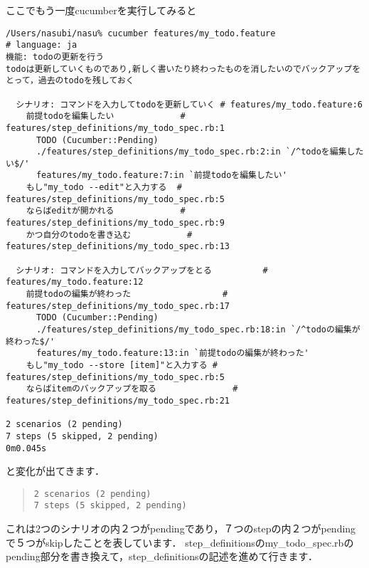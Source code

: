 ここでもう一度cucumberを実行してみると
\begin{lstlisting}[style=customCsh]
/Users/nasubi/nasu% cucumber features/my_todo.feature 
# language: ja
機能: todoの更新を行う
todoは更新していくものであり,新しく書いたり終わったものを消したいのでバックアップをとって，過去のtodoを残しておく

  シナリオ: コマンドを入力してtodoを更新していく # features/my_todo.feature:6
    前提todoを編集したい             # features/step_definitions/my_todo_spec.rb:1
      TODO (Cucumber::Pending)
      ./features/step_definitions/my_todo_spec.rb:2:in `/^todoを編集したい$/'
      features/my_todo.feature:7:in `前提todoを編集したい'
    もし"my_todo --edit"と入力する  # features/step_definitions/my_todo_spec.rb:5
    ならばeditが開かれる             # features/step_definitions/my_todo_spec.rb:9
    かつ自分のtodoを書き込む           # features/step_definitions/my_todo_spec.rb:13

  シナリオ: コマンドを入力してバックアップをとる          # features/my_todo.feature:12
    前提todoの編集が終わった                  # features/step_definitions/my_todo_spec.rb:17
      TODO (Cucumber::Pending)
      ./features/step_definitions/my_todo_spec.rb:18:in `/^todoの編集が終わった$/'
      features/my_todo.feature:13:in `前提todoの編集が終わった'
    もし"my_todo --store [item]"と入力する # features/step_definitions/my_todo_spec.rb:5
    ならばitemのバックアップを取る               # features/step_definitions/my_todo_spec.rb:21

2 scenarios (2 pending)
7 steps (5 skipped, 2 pending)
0m0.045s

\end{lstlisting}
と変化が出てきます．
\begin{quote}\begin{verbatim}
2 scenarios (2 pending)
7 steps (5 skipped, 2 pending)
\end{verbatim}\end{quote}
これは2つのシナリオの内２つがpendingであり，７つのstepの内２つがpendingで５つがskipしたことを表しています．
step\_definitionsのmy\_todo\_spec.rbのpending部分を書き換えて，step\_definitionsの記述を進めて行きます．

